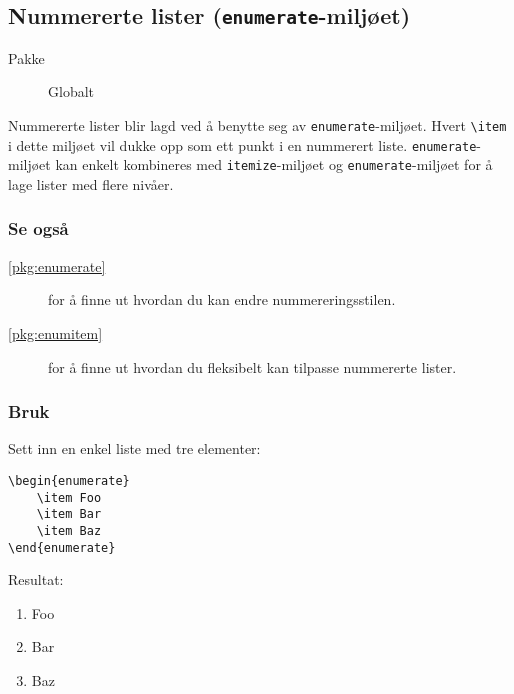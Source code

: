 \subsection{Nummererte lister (\texttt{enumerate}-miljøet)}
\label{env:enumerate}
\begin{description}
    \item[Pakke] Globalt
\end{description}

Nummererte lister blir lagd ved å benytte seg av \texttt{enumerate}-miljøet.
Hvert \texttt{\textbackslash item} i dette miljøet vil dukke opp som ett punkt i en nummerert liste.
\texttt{enumerate}-miljøet kan enkelt kombineres med \texttt{itemize}-miljøet og \texttt{enumerate}-miljøet for å lage lister med flere nivåer.

\subsubsection*{Se også}
\begin{description}
    \item[\ref{pkg:enumerate}~] for å finne ut hvordan du kan endre nummereringsstilen.
    \item[\ref{pkg:enumitem}~] for å finne ut hvordan du fleksibelt kan tilpasse nummererte lister.
\end{description}

\subsubsection*{Bruk}
Sett inn en enkel liste med tre elementer:
\vspace{0.75em}
\begin{lstlisting}[language=Tex]
\begin{enumerate}
    \item Foo
    \item Bar
    \item Baz
\end{enumerate}
\end{lstlisting}
\noindent Resultat:
\begin{enumerate}
    \item Foo
    \item Bar
    \item Baz
\end{enumerate}
\vspace{0.75em}


\horizontalrule



